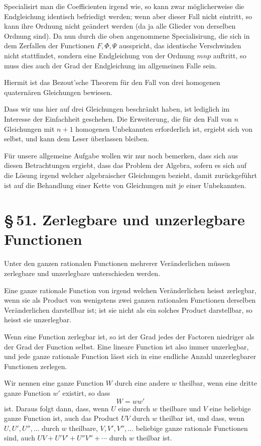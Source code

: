 \documentclass[11pt]{article}
\providecommand{\sect}[2]{\section*{\S\,#1. #2}}
\begin{document}
Specialisirt man die Coefficienten irgend wie, so kann zwar möglicherweise die Endgleichung identisch befriedigt werden; wenn aber dieser Fall nicht eintritt, so kann ihre Ordnung nicht geändert werden (da ja alle Glieder von derselben Ordnung sind). Da nun durch die oben angenommene Specialisirung, die sich in dem Zerfallen der Functionen $F,\Phi,\Psi$ ausspricht, das identische Verschwinden nicht stattfindet, sondern eine Endgleichung von der Ordnung $mnp$ auftritt, so muss dies auch der Grad der Endgleichung im allgemeinen Falle sein.

Hiermit ist das Bezout'sche Theorem für den Fall von drei homogenen quaternären Gleichungen bewiesen.

Dass wir uns hier auf drei Gleichungen beschränkt haben, ist lediglich im Interesse der Einfachheit geschehen. Die Erweiterung, die für den Fall von $n$ Gleichungen mit $n+1$ homogenen Unbekannten erforderlich ist, ergiebt sich von selbst, und kann dem Leser überlassen bleiben.

Für unsere allgemeine Aufgabe wollen wir nur noch bemerken, dass sich aus diesen Betrachtungen ergiebt, dass das Problem der Algebra, sofern es sich auf die Lösung irgend welcher algebraischer Gleichungen bezieht, damit zurückgeführt ist auf die Behandlung einer Kette von Gleichungen mit je einer Unbekannten.

\sect{51}{Zerlegbare und unzerlegbare Functionen}

Unter den ganzen rationalen Functionen mehrerer Veränderlichen müssen zerlegbare und unzerlegbare unterschieden werden.

Eine ganze rationale Function von irgend welchen Veränderlichen heisst zerlegbar, wenn sie als Product von wenigstens zwei ganzen rationalen Functionen derselben Veränderlichen darstellbar ist; ist sie nicht als ein solches Product darstellbar, so heisst sie unzerlegbar.

Wenn eine Function zerlegbar ist, so ist der Grad jedes der Factoren niedriger als der Grad der Function selbst. Eine lineare Function ist also immer unzerlegbar, und jede ganze rationale Function lässt sich in eine endliche Anzahl unzerlegbarer Functionen zerlegen.

Wir nennen eine ganze Function $W$ durch eine andere $w$ theilbar, wenn eine dritte ganze Function $w'$ existirt, so dass
\[
W=ww'
\]
ist. Daraus folgt dann, dass, wenn $U$ eine durch $w$ theilbare und $V$ eine beliebige ganze Function ist, auch das Product $UV$ durch $w$ theilbar ist, und dass, wenn $U,U',U'',\ldots$ durch $w$ theilbare, $V,V',V'',\ldots$ beliebige ganze rationale Functionen sind, auch $UV+U'V'+U''V''+\cdots$ durch $w$ theilbar ist.
\end{document}
